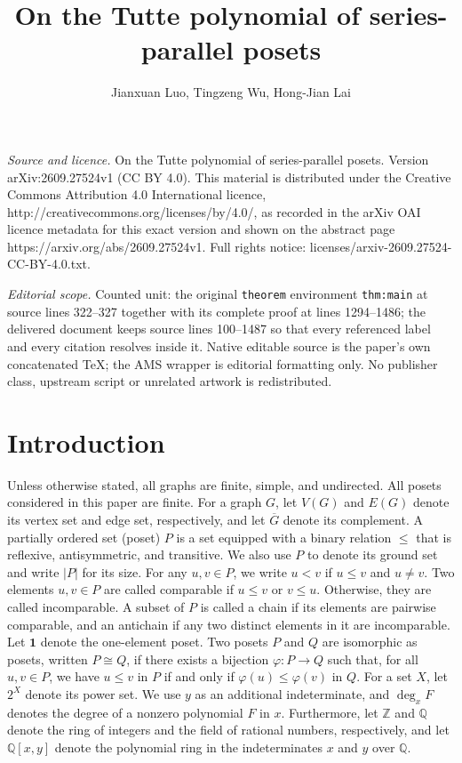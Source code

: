 \documentclass[10pt,a4paper]{amsart}
\begin{document}
\title[On the Tutte polynomial of series-parallel posets]{On the Tutte polynomial of series-parallel posets}
\author{Jianxuan Luo, Tingzeng Wu, Hong-Jian Lai}
\date{}
\maketitle
\noindent\emph{Source and licence.} On the Tutte polynomial of series-parallel posets. Version arXiv:2609.27524v1 (CC BY 4.0). This material is distributed under the Creative Commons Attribution 4.0 International licence, http://creativecommons.org/licenses/by/4.0/, as recorded in the arXiv OAI licence metadata for this exact version and shown on the abstract page https://arxiv.org/abs/2609.27524v1. Full rights notice: licenses/arxiv-2609.27524-CC-BY-4.0.txt.\par\smallskip
\noindent\textit{Editorial scope.} Counted unit: the original \texttt{theorem} environment \texttt{thm:main} at source lines 322--327 together with its complete proof at lines 1294--1486; the delivered document keeps source lines 100--1487 so that every referenced label and every citation resolves inside it. Native editable source is the paper's own concatenated TeX; the AMS wrapper is editorial formatting only. No publisher class, upstream script or unrelated artwork is redistributed.
\section{Introduction}

Unless otherwise stated, all graphs are finite, simple, and undirected.
All posets considered in this paper are finite.
For a graph $G$, let $V(G)$ and $E(G)$ denote its vertex set and edge set, respectively, 
and let $\overline{G}$ denote its complement.
A partially ordered set (poset) $P$ is a set equipped with a binary relation $\leq$ that is reflexive, antisymmetric, and transitive.
We also use $P$ to denote its ground set and write $|P|$ for its size.
For any $u,v\in P$, we write $u<v$ if $u\leq v$ and $u\neq v$.
Two elements $u,v\in P$ are called comparable if $u\leq v$ or $v\leq u$.
Otherwise, they are called incomparable.
A subset of $P$ is called a chain if its elements are pairwise comparable,
and an antichain if any two distinct elements in it are incomparable.
Let $\mathbf{1}$ denote the one-element poset.
Two posets $P$ and $Q$ are isomorphic as posets, written
$P\cong Q$, if there exists a bijection $\varphi:P\to Q$ such that,
for all $u,v\in P$, we have $u\leq v$ in $P$ if and only if
$\varphi(u)\leq\varphi(v)$ in $Q$.
For a set $X$, let $2^X$ denote its power set.
We use $y$ as an additional indeterminate, and $\deg_x F$
denotes the degree of a nonzero polynomial $F$ in $x$.
Furthermore, let $\mathbb{Z}$ and $\mathbb{Q}$ denote the ring of integers and the field of rational numbers, respectively, 
and let $\mathbb{Q}[x,y]$ denote the polynomial ring in the indeterminates $x$ and $y$ over $\mathbb{Q}$.
\end{document}
